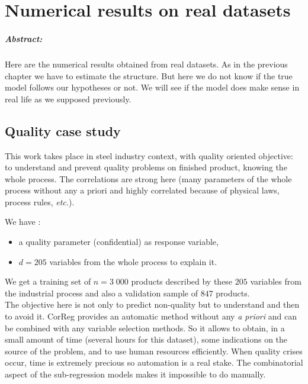\documentclass[12pt,a4paper]{report}
\begin{document}
\chapter{Numerical results on real datasets} \label{sectionrealcase}
\paragraph{Abstract:} Here are the numerical results obtained from real datasets. As in the previous chapter we have to estimate the structure. But here we do not know if the true model follows our hypotheses or not. We will see if the model does make sense in real life as we supposed previously.

	\section{Quality case study} \label{sectionexfos}
This work takes place in steel industry context, with quality oriented objective: to understand and prevent quality problems on finished product, knowing the whole process. The correlations are strong here (many parameters of the whole process without any a priori and highly correlated because of physical laws, process rules, {\it etc.}). 
		
We have :
		\begin{itemize}
			\item a quality parameter (confidential) as response variable,
			\item $d=205$ variables from the whole process to explain it.
		\end{itemize}
We get a training set of $n=3\;000$ products described by these $205$ variables from the industrial process and also a validation sample of $847$ products.\\

The objective here is not only to predict non-quality but to understand and then to avoid it. {\sc CorReg} provides an automatic method without any {\it a priori} and can be combined with any variable selection methods. So it allows to obtain, in a small amount of time (several hours for this dataset), some indications on the source of the problem, and to use human resources efficiently. When quality crises occur, time is extremely precious so automation is a real stake. The combinatorial aspect of the sub-regression models makes it impossible to do manually.\\

\end{document}
